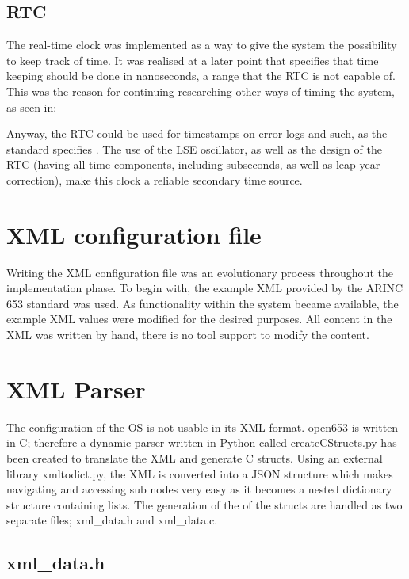 \subsection{RTC}
The real-time clock was implemented as a way to give the system the
possibility to keep track of time. It was realised at a later point
that \arinc{} specifies that time keeping should be done in nanoseconds,
a range that the RTC is not capable of. This was the reason for continuing 
researching other ways of timing the system, as seen in:

Anyway, the RTC could be used for timestamps on error logs and such,
as the standard specifies \cite{page_26}. The use of the LSE oscillator,
as well as the design of the RTC (having all time components, including
subseconds, as well as leap year correction), make this clock a reliable
secondary time source.

\section{XML configuration file}

Writing the XML configuration file was an evolutionary process throughout the implementation phase. To begin with, the example XML provided by the ARINC 653 standard was used. As functionality within the system became available, the example XML values were modified for the desired purposes. All content in the XML was written by hand, there is no tool support to modify the content.

\section{XML Parser}

The configuration of the OS is not usable in its XML format. open653 is written in C; therefore a dynamic parser written in Python called createCStructs.py has been created to translate the XML and generate C structs.
Using an external library xmltodict.py, the XML is converted into a JSON structure which makes navigating and accessing sub nodes very easy as it becomes a nested dictionary structure containing lists.
The generation of the of the structs are handled as two separate files; xml\_data.h and xml\_data.c. 

\subsection{xml\_data.h}

